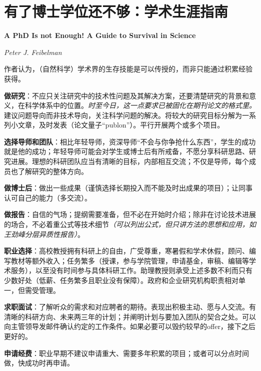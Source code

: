 
\chapter{有了博士学位还不够：学术生涯指南}
\Large\textbf{A PhD Is not Enough! A Guide to Survival in Science}
\par \emph{Peter J. Feibelman} \normalsize

\par 作者认为，（自然科学）学术界的生存技能是可以传授的，而非只能通过积累经验获得。

\par \textbf{做研究}：不应只关注研究中的技术性问题及其解决方案，还要清楚研究的背景和意义，在科学体系中的位置。\emph{时至今日，这一点要求已被固化在期刊论文的格式里。} 建议问题导向而非技术导向，关注科学问题的解决。将较大的研究目标分解为一系列小文章，及时发表（论文量子``publon''）。平行开展两个或多个项目。

\par \textbf{选择导师和团队}：相比年轻导师，资深导师“不会与你争抢什么东西”，学生的成功就是他的成功；年轻导师可能会对学生或博士后有所戒备，不愿分享科研思路、研究进展。理想的科研团队应当有清晰的目标，内部相互交流；不仅是导师，每个成员也了解研究的整体方向。

\par \textbf{做博士后}：做出一些成果（谨慎选择长期投入而不能及时出成果的项目）；让同事认可自己的能力（多交流）。

\par \textbf{做报告}：自信的气场；提纲需要准备，但不必在开始时介绍；除非在讨论技术进展的场合，不必着重公式等技术细节\emph{（可以列出公式，但只讲方法的思想和应用，如王劲峰分层异质性报告）}。

\par \textbf{职业选择}：高校教授拥有科研上的自由，广受尊重，寒暑假和学术休假，顾问、编写教材等额外收入；任务繁多（授课，参与学院管理，申请基金，审稿、编辑等学术服务），以至没有时间参与具体科研工作。助理教授则承受上述多数不利而只有少数好处（低薪、任务繁多且职业没有保障）。政府和企业研究机构职责相对单一，但需受管理。

\par \textbf{求职面试}：了解听众的需求和对应聘者的期待。表现出积极主动、愿与人交流。有清晰的科研方向、未来两三年的计划；并阐明计划与要加入团队的契合之处。可以向主管领导发邮件确认约定的工作条件。如果必要可以毁约较早的offer，接下之后更好的。

\par \textbf{申请经费}：职业早期不建议申请重大、需要多年积累的项目；或者可以分点时间做，快成功时再申请。